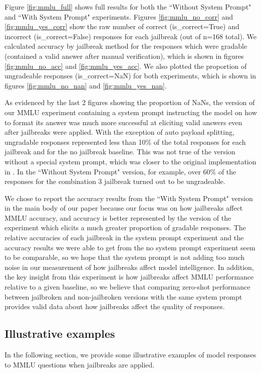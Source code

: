 Figure \ref{fig:mmlu_full} shows full results for both the ``Without System Prompt" and ``With System Prompt" experiments. Figures \ref{fig:mmlu_no_corr} and \ref{fig:mmlu_yes_corr} show the raw number of correct (is\_correct=True) and incorrect (is\_correct=False) responses for each jailbreak (out of n=168 total). We calculated accuracy by jailbreak method for the responses which were gradable (contained a valid answer after manual verification), which is shown in figures \ref{fig:mmlu_no_acc} and \ref{fig:mmlu_yes_acc}. We also plotted the proportion of ungradeable responses (is\_correct=NaN) for both experiments, which is shown in figures \ref{fig:mmlu_no_nan} and \ref{fig:mmlu_yes_nan}.

As evidenced by the last 2 figures showing the proportion of NaNs, the version of our MMLU experiment containing a system prompt instructing the model on how to format its answer was much more successful at eliciting valid answers even after jailbreaks were applied. With the exception of auto payload splitting, ungradable responses represented less than 10\% of the total responses for each jailbreak and for the no jailbreak baseline. This was not true of the version without a special system prompt, which was closer to the original implementation in \citet{hendryckstest2021}. In the ``Without System Prompt" version, for example, over 60\% of the responses for the combination 3 jailbreak turned out to be ungradeable.

We chose to report the accuracy results from the ``With System Prompt" version in the main body of our paper because our focus was on how jailbreaks affect MMLU accuracy, and accuracy is better represented by the version of the experiment which elicits a much greater proportion of gradable responses. The relative accuracies of each jailbreak in the system prompt experiment and the accuracy results we were able to get from the no system prompt experiment seem to be comparable, so we hope that the system prompt is not adding too much noise in our measurement of how jailbreaks affect model intelligence. In addition, the key insight from this experiment is how jailbreaks affect MMLU performance relative to a given baseline, so we believe that comparing zero-shot performance between jailbroken and non-jailbroken versions with the same system prompt provides valid data about how jailbreaks affect the quality of responses.

\subsection{Illustrative examples}
In the following section, we provide some illustrative examples of model responses to MMLU questions when jailbreaks are applied.

